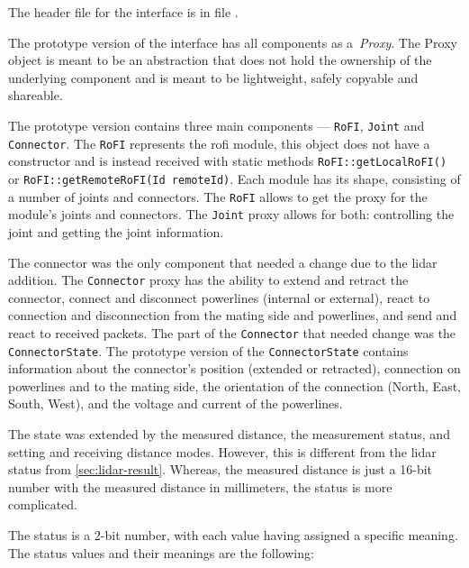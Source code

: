 \documentclass[
  digital,     %
  oneside,     %
  nosansbold,  %
  nocolorbold, %
  nolof,         %
  nolot,         %
]{fithesis4}
\begin{document}
The header file for the interface is in file
.

The prototype version of the interface has all components as a~\emph{Proxy}. The Proxy object is
meant to be an abstraction that does not hold the ownership of the underlying component and is meant
to be lightweight, safely copyable and shareable.

The prototype version contains three main components --- \lstinline[breakatwhitespace]|RoFI|,
\lstinline|Joint| and \lstinline|Connector|. The \lstinline|RoFI| represents the \acrshort{rofi}
module, this object does not have a constructor and is instead received with static methods
\lstinline|RoFI::getLocalRoFI()| or \lstinline|RoFI::getRemoteRoFI(Id remoteId)|. Each module has
its shape, consisting of a number of joints and connectors. The \lstinline|RoFI| allows to get the
proxy for the module's joints and connectors. The \lstinline|Joint| proxy allows for both:
controlling the joint and getting the joint information.

The connector was the only component that needed a change due to the \acrshort{lidar} addition. The
\lstinline|Connector| proxy has the ability to extend and retract the connector, connect and
disconnect powerlines (internal or external), react to connection and disconnection from the mating
side and powerlines, and send and react to received packets. The part of the \lstinline|Connector|
that needed change was the \lstinline|ConnectorState|. The prototype version of the
\lstinline|ConnectorState| contains information about the connector's position (extended or
retracted), connection on powerlines and to the mating side, the orientation of the connection
(North, East, South, West), and the voltage and current of the powerlines.

The state was extended by the measured distance, the measurement status, and setting and receiving
distance modes. However, this is different from the \acrshort{lidar} status from
\autoref{sec:lidar-result}. Whereas, the measured distance is just a 16-bit number with the measured
distance in millimeters, the status is more complicated.

The status is a 2-bit number, with each value having assigned a specific meaning. The status values
and their meanings are the following:
\end{document}
